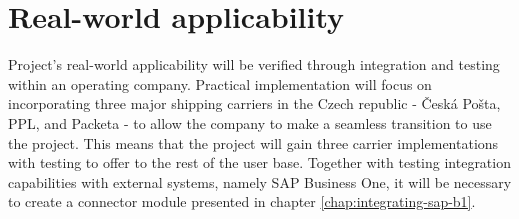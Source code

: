 \section{Real-world applicability}
\label{sec:real-world-applicability}
Project's real-world applicability will be verified through integration and testing within an operating company.
Practical implementation will focus on incorporating three major shipping carriers in the Czech republic - Česká Pošta, PPL, and Packeta - to allow the company to make a seamless transition to use the project.
This means that the project will gain three carrier implementations with testing to offer to the rest of the user base.
Together with testing integration capabilities with external systems, namely SAP Business One, it will be necessary to create a connector module presented in chapter \ref{chap:integrating-sap-b1}.

